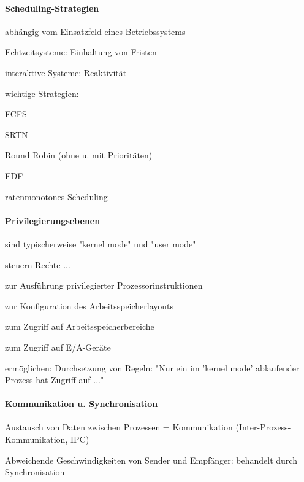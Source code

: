 \documentclass[a4pape]{article}
\begin{document}
\begin{multicols}{3}
  \paragraph{Scheduling-Strategien}
  \begin{itemize*}
    \item abhängig vom Einsatzfeld eines Betriebssystems
    \begin{itemize*}
      \item Echtzeitsysteme: Einhaltung von Fristen
      \item interaktive Systeme: Reaktivität
    \end{itemize*}
    \item wichtige Strategien:
    \begin{itemize*}
      \item FCFS
      \item SRTN
      \item Round Robin (ohne u. mit Prioritäten)
      \item EDF
      \item ratenmonotones Scheduling
    \end{itemize*}
  \end{itemize*}

  \paragraph{Privilegierungsebenen}
  \begin{itemize*}
    \item sind typischerweise "kernel mode" und "user mode"
    \item steuern Rechte ...
    \begin{itemize*}
      \item zur Ausführung privilegierter Prozessorinstruktionen
      \item zur Konfiguration des Arbeitsspeicherlayouts
      \item zum Zugriff auf Arbeitsspeicherbereiche
      \item zum Zugriff auf E/A-Geräte
    \end{itemize*}
    \item ermöglichen: Durchsetzung von Regeln: "Nur ein im 'kernel mode' ablaufender Prozess hat Zugriff auf ..."
  \end{itemize*}

  \paragraph{Kommunikation u. Synchronisation}
  \begin{itemize*}
    \item Austausch von Daten zwischen Prozessen = Kommunikation (Inter-Prozess-Kommunikation, IPC)
    \item Abweichende Geschwindigkeiten von Sender und Empfänger: behandelt durch Synchronisation
  \end{itemize*}


\end{multicols}
\end{document}
